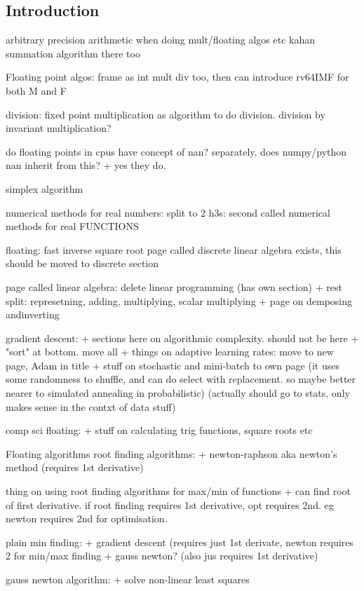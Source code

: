 
\subsection{Introduction}

arbitrary precision arithmetic when doing mult/floating algos etc
kahan summation algorithm there too

Floating point algos: frame as int mult div too, then can introduce rv64IMF for both M and F

division: fixed point multiplication as algorithm to do division. division by invariant multiplication?

do floating points in cpus have concept of nan? separately, does numpy/python nan inherit from this?
+ yes they do.

simplex algorithm

numerical methods for real numbers: split to 2 h3s: second called numerical methods for real FUNCTIONS

floating: fast inverse square root
page called discrete linear algebra exists, this should be moved to discrete section

page called linear algebra: delete linear programming (has own section)
+ rest split: represetning, adding, multiplying, scalar multiplying
+ page on demposing andinverting

gradient descent:
+ sections here on algorithmic complexity. should not be here
+ "sort" at bottom. move all
+ things on adaptive learning rates: move to new page, Adam in title
+ stuff on stochastic and mini-batch to own page (it uses some randomness to shuffle, and can do select with replacement. so maybe better nearer to simulated annealing in probabilistic) (actually should go to stats, only makes sense in the contxt of data stuff)

comp sci floating:
+ stuff on calculating trig functions, square roots etc

Floating algorithms
root finding algorithms:
+ newton-raphson aka newton's method (requires 1st derivative)

thing on using root finding algorithms for max/min of functions
+ can find root of first derivative. if root finding requires 1st derivative, opt requires 2nd. eg newton requires 2nd for optimisation.

plain min finding:
+ gradient descent (requires just 1st derivate, newton requires 2 for min/max finding
+ gauss newton? (also jus requires 1st derivative)

gauss newton algorithm:
+ solve non-linear least squares



